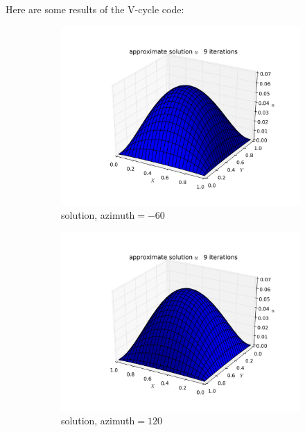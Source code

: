 \documentclass{article} %
\theoremstyle{plain}
\numberwithin{equation}{section} %
\numberwithin{figure}{section} %
\numberwithin{table}{section} %
\begin{document}
Here are some results of the V-cycle code:
\begin{figure}[!htb]
    \centering
    \begin{subfigure}[b]{0.45\textwidth}
        \centering
        \includegraphics[width=\textwidth]{figures/p1_run1_1.png}
        \caption*{solution, azimuth$=-60$}
    \end{subfigure}
    \hfill
    \begin{subfigure}[b]{0.45\textwidth}
        \centering
        \includegraphics[width=\textwidth]{figures/p1_run1_2.png}
        \caption*{solution, azimuth$=120$}
    \end{subfigure}
    \hfill
    \begin{subfigure}[b]{0.45\textwidth}

\end{subfigure}
\end{figure}
\end{document}
